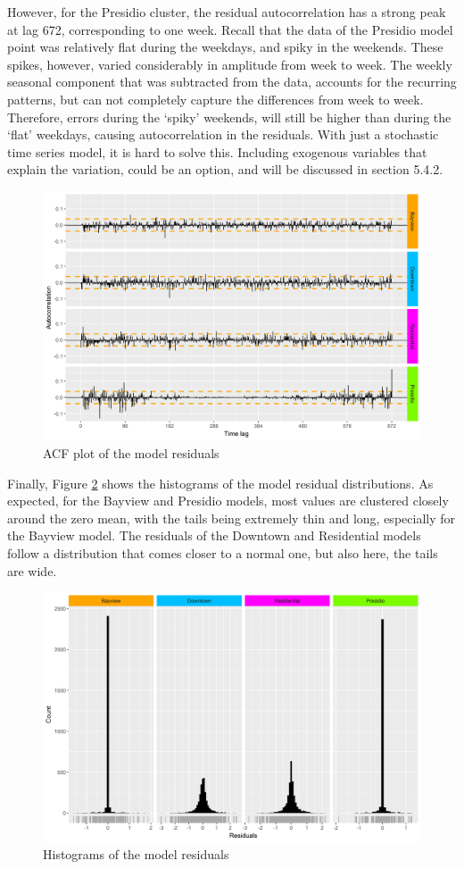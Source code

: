 \documentclass[12pt,oneside]{reedthesis}
\begin{document}
However, for the Presidio cluster, the residual autocorrelation has a
strong peak at lag 672, corresponding to one week. Recall that the data
of the Presidio model point was relatively flat during the weekdays, and
spiky in the weekends. These spikes, however, varied considerably in
amplitude from week to week. The weekly seasonal component that was
subtracted from the data, accounts for the recurring patterns, but can
not completely capture the differences from week to week. Therefore,
errors during the `spiky' weekends, will still be higher than during the
`flat' weekdays, causing autocorrelation in the residuals. With just a
stochastic time series model, it is hard to solve this. Including
exogenous variables that explain the variation, could be an option, and
will be discussed in section 5.4.2.
\begin{figure}[H]
\includegraphics[width=\textwidth]{Figures/residual_acfplots} \caption{ACF plot of the model residuals}\label{fig:residualacf}
\end{figure}
Finally, Figure \ref{fig:residualhist} shows the histograms of the model
residual distributions. As expected, for the Bayview and Presidio
models, most values are clustered closely around the zero mean, with the
tails being extremely thin and long, especially for the Bayview model.
The residuals of the Downtown and Residential models follow a
distribution that comes closer to a normal one, but also here, the tails
are wide.
\begin{figure}[H]
\includegraphics[width=\textwidth]{Figures/residual_histograms} \caption{Histograms of the model residuals}\label{fig:residualhist}
\end{figure}
\end{document}
